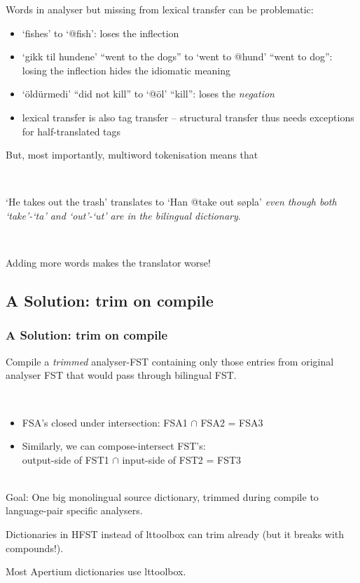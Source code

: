 \documentclass[notes=hide]{beamer}
\newcommand{\form}[1]{`#1'}
\begin{document}
\begin{frame}
  Words in analyser but missing from lexical transfer can be
  problematic:
  \begin{itemize}
  \item \form{fishes} to \form{@fish}: loses the inflection
  \item \form{gikk til hundene} ``went to the dogs'' to
    \form{went to @hund} ``went to dog'': losing the
    inflection hides the idiomatic meaning
  \item \form{öldürmedi} ``did not kill'' to \form{@öl} ``kill'':
    loses the \emph{negation}
  \item lexical transfer is also tag transfer – structural transfer
    thus needs exceptions for half-translated tags
  \end{itemize}
\end{frame}

\begin{frame}
  But, most importantly, multiword tokenisation means that

  ~

  \form{He takes out the trash} translates to \form{Han @take out
    søpla} \emph{even though both \form{take}-\form{ta} and
    \form{out}-\form{ut} are in the bilingual dictionary}.

  ~

  Adding more words makes the translator worse!
\end{frame}

\subsection{A Solution: trim on compile}
\begin{frame}
  \frametitle{A Solution: trim on compile}
  Compile a \emph{trimmed} analyser-FST containing only those entries
  from original analyser FST that would pass through bilingual FST.

  ~\\

  \begin{itemize}
  \item FSA's closed under intersection: FSA1 $\cap$ FSA2 = FSA3
  \item Similarly, we can compose-intersect FST's:\\
    output-side of FST1 $\cap$ input-side of FST2 = FST3
  \end{itemize}

  ~\\

  Goal: One big monolingual source dictionary, trimmed during compile
  to language-pair specific analysers.

  Dictionaries in HFST instead of lttoolbox can trim already (but it
  breaks with compounds!).

  Most Apertium dictionaries use lttoolbox.


\end{frame}
\end{document}
